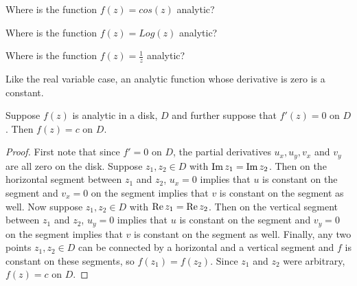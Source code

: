 \documentclass[handout]{ximera}
\begin{document}
\begin{problem}
Where is the function $f(z) = cos(z)$ analytic?\\
\begin{multipleChoice}
\end{multipleChoice}
\end{problem}

\begin{problem}
Where is the function $f(z) = Log(z)$ analytic?\\
\begin{multipleChoice}
\end{multipleChoice}
\end{problem}

\begin{problem}
Where is the function $f(z) = \frac{1}{z}$ analytic?\\
\begin{multipleChoice}
\end{multipleChoice}
\end{problem}

Like the real variable case, an analytic function whose derivative is zero is a constant.

\begin{theorem}
Suppose $f(z)$ is analytic in a disk, $D$ and further suppose that $f'(z) =0$ on $D$.
Then $f(z) =c$ on $D$.
\end{theorem}
\begin{proof}
First note that since $f'=0$ on $D$, the partial derivatives $u_x, u_y, v_x$ and $v_y$ 
are all zero on the disk.
Suppose $z_1, z_2 \in D$ with $\operatorname{Im} z_1 = \operatorname{Im} z_2$. Then on the horizontal segment 
between $z_1$ and $z_2$, $u_x = 0$ implies that $u$ is constant 
on the segment and $v_x =0$ on the segment implies that $v$ is constant on the segment as well.
Now suppose $z_1, z_2 \in D$ with $\operatorname{Re} z_1 = \operatorname{Re} z_2$. Then on the vertical segment 
between $z_1$ and $z_2$, $u_y = 0$ implies that $u$ is constant 
on the segment and $v_y =0$ on the segment implies that $v$ is constant on the segment as well.
Finally, any two points $z_1, z_2 \in D$ can be connected by a horizontal and a 
vertical segment and $f$ is constant on these segments, so $f(z_1) = f(z_2)$.
Since $z_1$ and $z_2$ were arbitrary, $f(z) =c$ on $D$. 
\end{proof}
\end{document}
